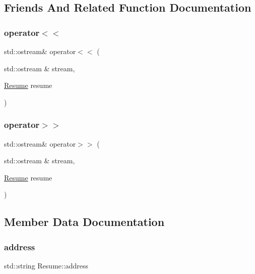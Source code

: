 \subsection{Friends And Related Function Documentation}
\hypertarget{class_resume_a4802836099b1fa0441f74d081cd39cf2}{}\label{class_resume_a4802836099b1fa0441f74d081cd39cf2} 
\subsubsection{\texorpdfstring{operator$<$$<$}{operator<<}}
{\footnotesize\ttfamily std\+::ostream\& operator$<$$<$ (\begin{DoxyParamCaption}\item[{std\+::ostream \&}]{stream,  }\item[{\hyperlink{class_resume}{Resume}}]{resume }\end{DoxyParamCaption})\hspace{0.3cm}{\ttfamily [friend]}}

\hypertarget{class_resume_a3e74504543874fb381d00e0e9444d85f}{}\label{class_resume_a3e74504543874fb381d00e0e9444d85f} 
\subsubsection{\texorpdfstring{operator$>$$>$}{operator>>}}
{\footnotesize\ttfamily std\+::ostream\& operator$>$$>$ (\begin{DoxyParamCaption}\item[{std\+::ostream \&}]{stream,  }\item[{\hyperlink{class_resume}{Resume}}]{resume }\end{DoxyParamCaption})\hspace{0.3cm}{\ttfamily [friend]}}



\subsection{Member Data Documentation}
\hypertarget{class_resume_a31098a2b61a35edbf3c6a525235e5976}{}\label{class_resume_a31098a2b61a35edbf3c6a525235e5976} 
\subsubsection{\texorpdfstring{address}{address}}
{\footnotesize\ttfamily std\+::string Resume\+::address\hspace{0.3cm}{\ttfamily [private]}}

